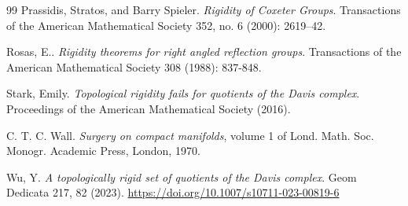 \documentclass[11pt,a4paper]{article}
\numberwithin{equation}{section}
\theoremstyle{named}
\begin{document}
\begin{thebibliography}{99}
Prassidis, Stratos, and Barry Spieler. \emph{Rigidity of Coxeter Groups}. Transactions of the American Mathematical Society 352, no. 6 (2000): 2619–42. 

Rosas, E.. \emph{Rigidity theorems for right angled reflection groups}. Transactions of the American Mathematical Society 308 (1988): 837-848.

Stark, Emily. \emph{Topological rigidity fails for quotients of the Davis complex}. Proceedings of the American Mathematical Society (2016).

C. T. C. Wall. \emph{Surgery on compact manifolds}, volume 1 of Lond. Math. Soc. Monogr. Academic Press, London, 1970.

Wu, Y. \emph{A topologically rigid set of quotients of the Davis complex}. Geom Dedicata 217, 82 (2023). \url{https://doi.org/10.1007/s10711-023-00819-6}

\end{thebibliography}
\end{document}
